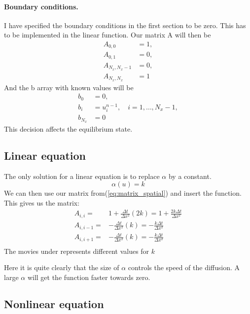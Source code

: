 \documentclass{book}
\begin{document}
\paragraph{Boundary conditions.}
I have specified the boundary conditions in the first section to be zero. This has to be implemented in the linear function.
Our matrix A will then be
\begin{align*}
A_{0,0} &= 1,\\
A_{0,1} &= 0,\\
A_{N_x,N_x-1} &= 0,\\
A_{N_x,N_x} &= 1
\end{align*}
And the b array with known values will be
\begin{align*}
b_0 &= 0,\\
b_i &= u^{n-1}_i,\quad i=1,\ldots,N_x-1,\\
b_{N_x} &= 0 
\end{align*}
This decision affects the equilibrium state. 

\subsection{Linear equation}

The only solution for a linear equation is to replace $\alpha$ by a
constant.
\begin{equation}
	\alpha(u) = k
\end{equation}
We can then use our matrix from(\ref{eq:matrix_spatial}) and insert the function. This gives us
the matrix:
\begin{align*} \label{eq:matrix_constant}
A_{i,i} =& 1+\frac{\Delta t}{\Delta x^2}(2k)=1+\frac{2k\Delta t}{\Delta x^2}\\
A_{i,i-1} =&-\frac{\Delta t}{\Delta x^2}(k)=-\frac{k \Delta t}{\Delta x^2}\\
A_{i,i+1} =&-\frac{\Delta t}{\Delta x^2}(k)=-\frac{k \Delta t}{\Delta x^2}\\
\end{align*}                               
The movies under represents different values for $k$


Here it is quite clearly that the size of $\alpha$ controls the speed of the
diffusion. A large $\alpha$ will get the function faster towards zero. 

\subsection{Nonlinear equation}
\end{document}
